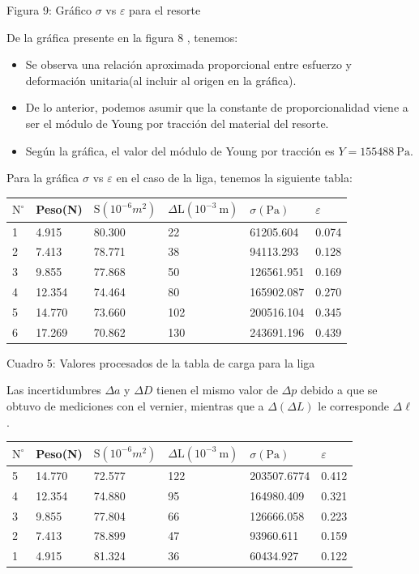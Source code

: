 \documentclass[10pt]{article}
\begin{document}
Figura 9: Gráfico $\sigma$ vs $\varepsilon$ para el resorte

De la gráfica presente en la figura 8 , tenemos:

\begin{itemize}
  \item Se observa una relación aproximada proporcional entre esfuerzo y deformación unitaria(al incluir al origen en la gráfica).
  \item De lo anterior, podemos asumir que la constante de proporcionalidad viene a ser el módulo de Young por tracción del material del resorte.
  \item Según la gráfica, el valor del módulo de Young por tracción es $Y=155488 \mathrm{~Pa}$.
\end{itemize}

Para la gráfica $\sigma$ vs $\varepsilon$ en el caso de la liga, tenemos la siguiente tabla:

\begin{center}
\begin{tabular}{|l|l|l|l|l|l|}
\hline
$\mathrm{N}^{\circ}$ & Peso(N) & $\mathrm{S}\left(10^{-6} m^{2}\right)$ & $\Delta \mathrm{L}\left(10^{-3} \mathrm{~m}\right)$ & $\sigma(\mathrm{Pa})$ & $\varepsilon$ \\
\hline
1 & 4.915 & 80.300 & 22 & 61205.604 & 0.074 \\
\hline
2 & 7.413 & 78.771 & 38 & 94113.293 & 0.128 \\
\hline
3 & 9.855 & 77.868 & 50 & 126561.951 & 0.169 \\
\hline
4 & 12.354 & 74.464 & 80 & 165902.087 & 0.270 \\
\hline
5 & 14.770 & 73.660 & 102 & 200516.104 & 0.345 \\
\hline
6 & 17.269 & 70.862 & 130 & 243691.196 & 0.439 \\
\hline
\end{tabular}
\end{center}

Cuadro 5: Valores procesados de la tabla de carga para la liga

Las incertidumbres $\Delta a$ y $\Delta D$ tienen el mismo valor de $\Delta p$ debido a que se obtuvo de mediciones con el vernier, mientras que a $\Delta(\Delta L)$ le corresponde $\Delta \ell$.

\begin{center}
\begin{tabular}{|l|l|l|l|l|l|}
\hline
$\mathrm{N}^{\circ}$ & Peso(N) & $\mathrm{S}\left(10^{-6} m^{2}\right)$ & $\Delta \mathrm{L}\left(10^{-3} \mathrm{~m}\right)$ & $\sigma(\mathrm{Pa})$ & $\varepsilon$ \\
\hline
5 & 14.770 & 72.577 & 122 & 203507.6774 & 0.412 \\
\hline
4 & 12.354 & 74.880 & 95 & 164980.409 & 0.321 \\
\hline
3 & 9.855 & 77.804 & 66 & 126666.058 & 0.223 \\
\hline
2 & 7.413 & 78.899 & 47 & 93960.611 & 0.159 \\
\hline
1 & 4.915 & 81.324 & 36 & 60434.927 & 0.122 \\
\hline
\end{tabular}
\end{center}
\end{document}
